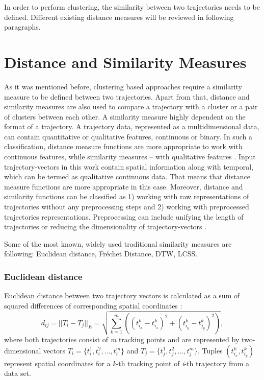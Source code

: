 In order to perform clustering, the similarity between two trajectories needs to be defined. Different existing distance measures will be reviewed in following paragraphs.

\section{Distance and Similarity Measures}
As it was mentioned before, clustering based approaches require a similarity measure to be defined between two trajectories. Apart from that, distance and similarity measures are also used to compare a trajectory with a cluster or a pair of clusters between each other. A similarity measure highly dependent on the format of a trajectory. A trajectory data, represented as a multidimensional data, can contain quantitative or qualitative features, continuous or binary. In such a classification, distance measure functions are more appropriate to work with continuous features, while similarity measures – with qualitative features \cite{article:23_survey_ca}. Input trajectory-vectors in this work contain spatial information along with temporal, which can be termed as qualitative continuous data. That means that distance measure functions are more appropriate in this case. Moreover, distance and similarity functions can be classified as 1) working with raw representations of trajectories without any preprocessing steps and 2) working with preprocessed trajectories representations. Preprocessing can include unifying the length of trajectories or reducing the dimensionality of trajectory-vectors \cite{inproceedings:7_related_work}. 

Some of the most known, widely used traditional similarity measures are following: Euclidean distance, Fréchet Distance, DTW, LCSS.

\subsubsection{Euclidean distance}
Euclidean distance between two trajectory vectors is calculated as a sum of squared differences of corresponding spatial coordinates \cite{article:27_vna_cad_td}:
\begin{equation}
	 d_{ij} = ||T_i - T_j||_E = \sqrt{\sum_{k=1}^{m}((t_{i_x}^k - t_{i_x}^k)^2 + (t_{i_y}^k - t_{j_y}^k)^2)},
\end{equation}
where both trajectories consist of \textit{m} tracking points and are represented by two-dimensional vectors $T_i = \{t_i^1, t_i^2, \ldots, t_i^m\}$ and $T_j = \{t_j^1, t_j^2, \ldots, t_j^m\}$. Tuples $(t_{i_x}^k, t_{i_y}^k)$ represent spatial coordinates for a \textit{k}-th tracking point of \textit{i}-th trajectory from a data set.

